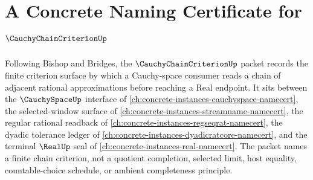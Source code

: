\chapter{A Concrete Naming Certificate for $\CauchyChainCriterionUp$}
\label{ch:concrete-instances-cauchy-chain-criterion-namecert}

Following Bishop and Bridges, the $\CauchyChainCriterionUp$ packet records the finite criterion surface by which a Cauchy-space consumer reads a chain of adjacent rational approximations before reaching a Real endpoint. It sits between the $\CauchySpaceUp$ interface of \autoref{ch:concrete-instances-cauchyspace-namecert}, the selected-window surface of \autoref{ch:concrete-instances-streamname-namecert}, the regular rational readback of \autoref{ch:concrete-instances-regseqrat-namecert}, the dyadic tolerance ledger of \autoref{ch:concrete-instances-dyadicratcore-namecert}, and the terminal $\RealUp$ seal of \autoref{ch:concrete-instances-real-namecert}. The packet names a finite chain criterion, not a quotient completion, selected limit, host equality, countable-choice schedule, or ambient completeness principle.

